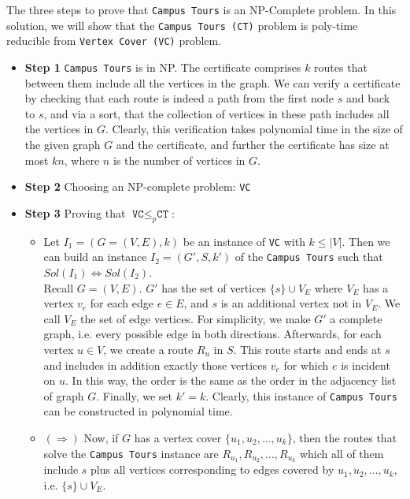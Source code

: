 \documentclass{article}
\begin{document}
The three steps to prove that \texttt{Campus Tours} is an NP-Complete problem. In this solution, we will show that the \texttt{Campus Tours (CT)} problem is poly-time reducible from \texttt{Vertex Cover (VC)} problem.
\begin{itemize}
	\item \textbf{Step 1} \texttt{Campus Tours} is in NP. The certificate comprises $k$ routes that between them include all the vertices in the graph. We can verify a certificate by checking that each route is indeed a path from the first node $s$ and back to $s$, and via a sort, that the collection of vertices in these path includes all the vertices in $G$. Clearly, this verification takes polynomial time in the size of the given graph $G$ and the certificate, and further the certificate has size at most $kn$, where $n$ is the number of vertices in $G$. 
	
	\item \textbf{Step 2} Choosing an NP-complete problem: \texttt{VC}
	
	\item \textbf{Step 3} Proving that $\texttt{VC} \leq_p \texttt{CT}$:\\
	\begin{itemize}
		\item Let $I_1 = (G=(V,E), k)$ be an instance of \texttt{VC} with $k \leq |V|$. Then we can build an instance $I_2 = (G', S, k')$ of the \texttt{Campus Tours} such that $Sol(I_1) \Leftrightarrow Sol(I_2)$. \\
		Recall $G=(V,E)$. $G'$ has the set of vertices $\{s\} \cup V_E$ where $V_E$ has a vertex $v_e$ for each edge $e \in E$, and $s$ is an additional vertex not in $V_E$. We call $V_E$ the set of edge vertices. For simplicity, we make $G'$ a complete graph, i.e. every possible edge in both directions. Afterwards, for each vertex $u \in V$, we create a route $R_u$ in $S$. This route starts and ends at $s$ and includes in addition exactly those vertices $v_e$ for which $e$ is incident on $u$. In this way, the order is the same as the order in the adjacency list of graph $G$. Finally, we set $k'=k$. Clearly, this instance of \texttt{Campus Tours} can be constructed in polynomial time.
		
		\item $(\Rightarrow)$ Now, if $G$ has a vertex cover $\{u_1, u_2, \ldots, u_k\}$, then the routes that solve the \texttt{Campus Tours} instance are $R_{u_1}, R_{u_2}, \ldots, R_{u_k} $ which all of them include $s$ plus all vertices corresponding to edges covered by $u_1, u_2, \ldots, u_k$, i.e. $\{s\} \cup V_E$.
		

\end{itemize}
\end{itemize}
\end{document}
